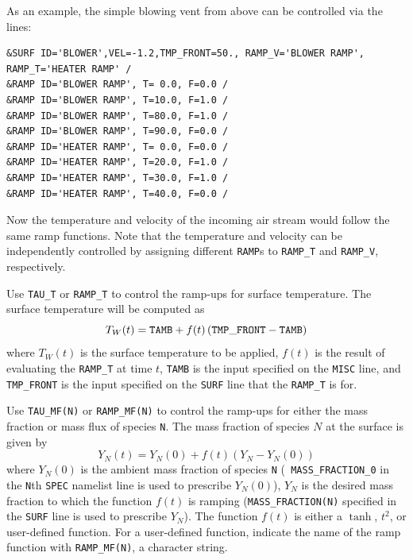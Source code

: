 \documentclass[11pt]{book}
\newcommand{\ct}{\tt\small}
\newcommand{\be}{\begin{equation}}
\newcommand{\ee}{\end{equation}}
\begin{document}
As an example, the simple blowing vent from above can be controlled via the lines:

\footnotesize
\begin{verbatim}
&SURF ID='BLOWER',VEL=-1.2,TMP_FRONT=50., RAMP_V='BLOWER RAMP', RAMP_T='HEATER RAMP' /
&RAMP ID='BLOWER RAMP', T= 0.0, F=0.0 /
&RAMP ID='BLOWER RAMP', T=10.0, F=1.0 /
&RAMP ID='BLOWER RAMP', T=80.0, F=1.0 /
&RAMP ID='BLOWER RAMP', T=90.0, F=0.0 /
&RAMP ID='HEATER RAMP', T= 0.0, F=0.0 /
&RAMP ID='HEATER RAMP', T=20.0, F=1.0 /
&RAMP ID='HEATER RAMP', T=30.0, F=1.0 /
&RAMP ID='HEATER RAMP', T=40.0, F=0.0 /
\end{verbatim}
\normalsize

\noindent
Now the temperature and velocity of the incoming air stream would
follow the same ramp functions. Note that the temperature and
velocity can be independently controlled by assigning different
{\ct RAMP}s to {\ct RAMP\_T} and {\ct RAMP\_V}, respectively.

Use {\ct TAU\_T} or {\ct RAMP\_T}
to control the ramp-ups for surface temperature.
The surface temperature will be computed as
\be T_W(t) = {\ct TAMB} + f(t) \left( {\ct TMP\_FRONT} - {\ct TAMB} \right) \ee
where $T_W(t)$ is the surface temperature to be applied, $f(t)$ is the result of evaluating the
{\ct RAMP\_T} at time $t$, {\ct TAMB} is the input specified on the {\ct MISC} line, and {\ct TMP\_FRONT} is the
input specified on the {\ct SURF} line that the {\ct RAMP\_T} is for.

Use {\ct TAU\_MF(N)} or {\ct RAMP\_MF(N)}
to control the ramp-ups for either the mass
fraction or mass flux of species {\ct N}.
The mass fraction of species $N$ at the surface is given by
$$ Y_N(t) = Y_N(0) + f(t) \left( Y_N - Y_N(0) \right) $$ where
$Y_N(0)$ is the ambient mass fraction of species {\ct N} ({\ct
MASS\_FRACTION\_0} in the {\ct N}th {\ct SPEC} namelist line is used
to prescribe $Y_N(0)$), $Y_N$ is the desired mass fraction to which
the function $f(t)$ is ramping ({\ct MASS\_FRACTION(N)} specified in
the {\ct SURF} line is used to prescribe $Y_N$).  The function $f(t)$
is either a $\tanh$, $t^2$, or user-defined function. For a
user-defined function, indicate the name of the ramp function with
{\ct RAMP\_MF(N)}, a character string.
\end{document}
